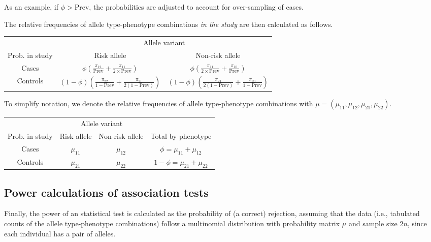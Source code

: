As an example, if $\phi > \text{Prev}$, the probabilities are adjusted to account for over-sampling of cases.

The relative frequencies of allele type-phenotype combinations {\it in the study} are then calculated as follows.

\begin{center}
    \begin{tabular}{ccc}
    \hline
    & \multicolumn{2}{c}{Allele variant} \\
    \cline{2-3}
    Prob. in study & Risk allele & Non-risk allele \\
    \hline
    Cases & $\phi\left(\frac{\pi_{12}}{\text{Prev}}+\frac{\pi_{11}}{2\times\text{Prev}}\right)$ & $\phi\left(\frac{\pi_{11}}{2\times\text{Prev}}+\frac{\pi_{10}}{\text{Prev}}\right)$ \\
    Controls & $(1-\phi)\left(\frac{\pi_{22}}{1-\text{Prev}}+\frac{\pi_{21}}{2(1-\text{Prev})}\right)$ & $(1-\phi)\left(\frac{\pi_{21}}{2(1-\text{Prev})}+\frac{\pi_{20}}{1-\text{Prev}}\right)$ \\
    \hline
    \end{tabular}
\end{center}

To simplify notation, we denote the relative frequencies of allele type-phenotype combinations with $\mu = (\mu_{11}, \mu_{12}, \mu_{21}, \mu_{22})$.


\begin{center}
    \begin{tabular}{cccc}
    \hline
    & \multicolumn{2}{c}{Allele variant} & \\
    \cline{2-3}
    Prob. in study & Risk allele & Non-risk allele & Total by phenotype \\
    \hline
    Cases & $\mu_{11}$ & $\mu_{12}$ & $\phi = \mu_{11} + \mu_{12}$ \\
    Controls & $\mu_{21}$ & $\mu_{22}$ & $1-\phi = \mu_{21} + \mu_{22}$ \\
    \hline
    \end{tabular}
\end{center}

\subsection{Power calculations of association tests}

Finally, the power of an statistical test is calculated as the probability of (a correct) rejection, assuming that the data (i.e., tabulated counts of the allele type-phenotype combinations) follow a multinomial distribution with probability matrix $\mu$ and sample size $2n$, since each individual has a pair of alleles.

